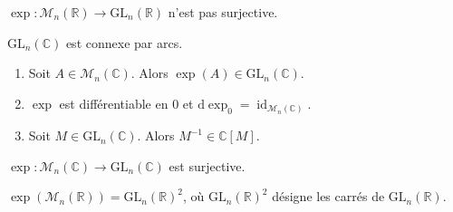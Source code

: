   \begin{application}
    $\exp : \mathcal{M}_n(\mathbb{R}) \rightarrow \mathrm{GL}_n(\mathbb{R})$ n'est pas surjective.
  \end{application}


  \begin{proposition}
    $\mathrm{GL}_n(\mathbb{C})$ est connexe par arcs.
  \end{proposition}


  \begin{lemma}
    \begin{enumerate}[label=(\roman*)]
      \item Soit $A \in \mathcal{M}_n(\mathbb{C})$. Alors $\exp(A) \in \mathrm{GL}_n(\mathbb{C})$.
      \item $\exp$ est différentiable en $0$ et $\mathrm{d}\exp_0 = \operatorname{id}_{\mathcal{M}_n(\mathbb{C})}$.
      \item Soit $M \in \mathrm{GL}_n(\mathbb{C})$. Alors $M^{-1} \in \mathbb{C}[M]$.
    \end{enumerate}
  \end{lemma}


  \begin{theorem}
    $\exp : \mathcal{M}_n(\mathbb{C}) \rightarrow \mathrm{GL}_n(\mathbb{C})$ est surjective.
  \end{theorem}

  \begin{application}
    $\exp(\mathcal{M}_n(\mathbb{R})) = \mathrm{GL}_n(\mathbb{R})^2$, où $\mathrm{GL}_n(\mathbb{R})^2$ désigne les carrés de $\mathrm{GL}_n(\mathbb{R})$.
  \end{application}

